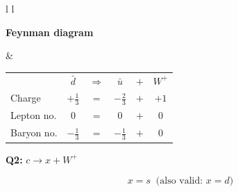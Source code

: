 \documentclass[12pt]{article}
\begin{document}
\vspace{0.4cm}

\begin{tabular}{l l}

\begin{minipage}[t]{0.46\textwidth}
\vspace{0pt}
\textbf{Feynman diagram}

\vspace{0.6cm}

\begin{tikzpicture}
\begin{feynman}
  \vertex (l1) at (0,0) {\(\bar{d}\)};
  \vertex [coordinate] (a) at (1,2) {};
  \vertex (l2) at (0,4) {\(\bar{u}\)};
  \vertex (b) at (4,2) {};

  \diagram*{
    (l1) -- [fermion] (a) -- [fermion] (l2),
    (a) -- [boson, edge label=\(W^+\), momentum'={}] (b),
  };
\end{feynman}
\end{tikzpicture}
\end{minipage}
&
\begin{minipage}[t]{0.50\textwidth}
\vspace{0pt}

\renewcommand{\arraystretch}{1.4}
\begin{tabular}{@{}l c c c c c@{}}
 & \(\bar{d}\) & \(\Rightarrow\) & \(\bar{u}\) & \(+\) & \(W^+\) \\
Charge & \(+\tfrac{1}{3}\) & \(=\) & \(-\tfrac{2}{3}\) & \(+\) & \(+1\) \\
Lepton no. & \(0\) & \(=\) & \(0\) & \(+\) & \(0\) \\
Baryon no. & \(-\tfrac{1}{3}\) & \(=\) & \(-\tfrac{1}{3}\) & \(+\) & \(0\) \\
\end{tabular}

\end{minipage}

\end{tabular}

\vspace{0.8cm}

\newpage
\textbf{Q2:} \(c \rightarrow x + W^+\)

\[
\boxed{x = s \;\; \text{(also valid: } x=d\text{)}}
\]

\vspace{0.4cm}
\end{document}
